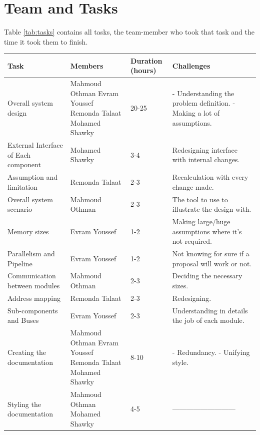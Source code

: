 \documentclass[12pt]{report}
\begin{document}
\section{Team and Tasks}
Table \ref{tab:tasks} contains all tasks, the team-member who took that task and the time it took them to finish.
\begin{table}
 \begin{tabular}{||p{30mm}| p{40mm}| p{15mm}| p{40mm}||} 
 \hline
 Task & Members & Duration \newline (hours) & Challenges  \\ [0.5ex] 
 \hline\hline
 Overall system design & Mahmoud Othman \newline Evram Youssef \newline Remonda Talaat \newline Mohamed Shawky & 20-25 & - Understanding the problem definition. \newline - Making a lot of assumptions. \\
 \hline
 External Interface of Each component & Mohamed Shawky & 3-4 & Redesigning interface with internal changes. \\ 
 \hline
 Assumption and limitation & Remonda Talaat  & 2-3 & Recalculation with every change made. \\
 \hline
 Overall system scenario & Mahmoud Othman & 2-3 & The tool to use to illustrate the design with. \\
 \hline
 Memory sizes & Evram Youssef & 1-2 & Making large/huge assumptions where it's not required. \\
 \hline
 Parallelism and Pipeline & Evram Youssef & 1-2 & Not knowing for sure if a proposal will work or not. \\
 \hline
 Communication between modules & Mahmoud Othman & 2-3 & Deciding the necessary sizes. \\
 \hline
 Address mapping & Remonda Talaat & 2-3 & Redesigning. \\
 \hline
 Sub-components and Buses & Evram Youssef & 2-3 & Understanding in details the job of each module. \\
 \hline
 Creating the documentation & Mahmoud Othman \newline Evram Youssef \newline Remonda Talaat \newline Mohamed Shawky & 8-10 & - Redundancy. \newline - Unifying style. \\
 \hline
 Styling the documentation & Mahmoud Othman \newline Mohamed Shawky & 4-5 & --------------------------- \\
 \hline\hline
\end{tabular}
\end{table}
\end{document}
